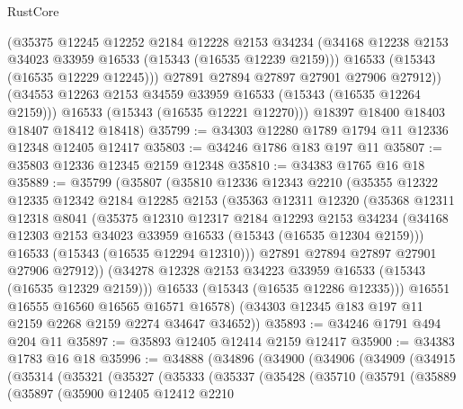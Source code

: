 \begin{lexlean}{RustCore}
\begin{coremodule}
            (@35375
              @12245
              @12252
              @2184
              @12228
              @2153
              @34234
              (@34168 @12238 @2153 @34023 @33959 @16533 (@15343 (@16535 @12239 @2159)))
              @16533
              (@15343 (@16535 @12229 @12245)))
            @27891
            @27894
            @27897
            @27901
            @27906
            @27912))
        (@34553 @12263 @2153 @34559 @33959 @16533 (@15343 (@16535 @12264 @2159)))
        @16533
        (@15343 (@16535 @12221 @12270)))
      @18397
      @18400
      @18403
      @18407
      @18412
      @18418)
@35799 := @34303 @12280 @1789 @1794 @11 @12336 @12348 @12405 @12417
@35803 := @34246 @1786 @183 @197 @11
@35807 := @35803 @12336 @12345 @2159 @12348
@35810 := @34383 @1765 @16 @18
@35889 := @35799
    (@35807
      (@35810
        @12336
        @12343
        @2210
        (@35355
          @12322
          @12335
          @12342
          @2184
          @12285
          @2153
          (@35363
            @12311
            @12320
            (@35368
              @12311
              @12318
              @8041
              (@35375
                @12310
                @12317
                @2184
                @12293
                @2153
                @34234
                (@34168 @12303 @2153 @34023 @33959 @16533 (@15343 (@16535 @12304 @2159)))
                @16533
                (@15343 (@16535 @12294 @12310)))
              @27891
              @27894
              @27897
              @27901
              @27906
              @27912))
          (@34278 @12328 @2153 @34223 @33959 @16533 (@15343 (@16535 @12329 @2159)))
          @16533
          (@15343 (@16535 @12286 @12335)))
        @16551
        @16555
        @16560
        @16565
        @16571
        @16578)
      (@34303 @12345 @183 @197 @11 @2159 @2268 @2159 @2274 @34647 @34652))
@35893 := @34246 @1791 @494 @204 @11
@35897 := @35893 @12405 @12414 @2159 @12417
@35900 := @34383 @1783 @16 @18
@35996 := @34888
    (@34896
      (@34900
        (@34906
          (@34909
            (@34915
              (@35314
                (@35321
                  (@35327
                    (@35333
                      (@35337
                        (@35428
                          (@35710
                            (@35791
                              (@35889
                                (@35897
                                  (@35900
                                    @12405
                                    @12412
                                    @2210

\end{coremodule}
\end{lexlean}
